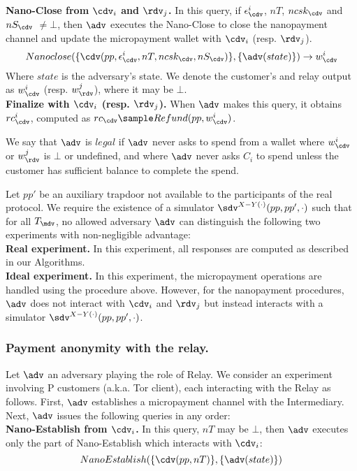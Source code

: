\textbf{Nano-Close from $\cdv_i$ and $\rdv_j$.} In this query, if $\epsilon^i_\cdv$, $nT$, $ncsk_\cdv$ and $nS_\cdv$ $\neq \bot$, then $\adv$ executes the Nano-Close to close the nanopayment channel and update the micropayment wallet with $\cdv_i$ (resp. $\rdv_j$).
$$Nano\-close(\{\cdv(pp, \epsilon^i_\cdv, nT, ncsk_\cdv, nS_\cdv)\}, \{\adv(state)\}) \rightarrow w^i_\cdv$$
Where $state$ is the adversary's state. We denote the customer's and relay output as $w^i_\cdv$ (resp. $w^j_\rdv$), where it may be $\bot$.\\

\textbf{Finalize with $\cdv_i$ (resp. $\rdv_j$).} When $\adv$ makes this query, it obtains $rc^i_\cdv$, computed as $rc_\cdv \sample Refund(pp, w^i_\cdv)$.

We say that $\adv$ is $legal$ if $\adv$ never asks to spend from a wallet where $w^i_\cdv$ or $w^j_\rdv$ is $\bot$ or undefined, and where $\adv$ never asks $C_i$ to spend unless the customer has sufficient balance to complete the spend.

Let $pp'$ be an auxiliary trapdoor not available to the participants of the real protocol. We require the existence of a simulator $\sdv^{X-Y(\cdot)}(pp, pp', \cdot)$ such that for all $T_\mdv$, no allowed adversary $\adv$ can distinguish the following two experiments with non-negligible advantage:\\
\textbf{Real experiment.} In this experiment, all responses are computed as described in our Algorithms.\\
\textbf{Ideal experiment.} In this experiment, the micropayment operations are handled using the procedure above. However, for the nanopayment procedures, $\adv$ does not interact with $\cdv_i$ and $\rdv_j$ but instead interacts with a simulator $\sdv^{X-Y(\cdot)}(pp,pp',\cdot)$.

\subsubsection{Payment anonymity with the relay.}

Let $\adv$ an adversary playing the role of Relay. We consider an experiment involving P customers (a.k.a. Tor client), each interacting with the Relay as follows. First, $\adv$ establishes a micropayment channel with the Intermediary. Next, $\adv$ issues the following queries in any order:\\

\textbf{Nano-Establish from $\cdv_i$.} In this query, $nT$ may be $\bot$, then $\adv$ executes only the part of Nano-Establish which interacts with $\cdv_i$:
$$Nano\-Establish(\{\cdv(pp, nT)\}, \{\adv(state)\})$$

